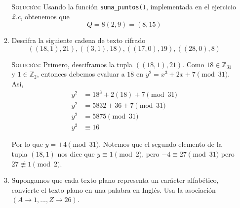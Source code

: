 \documentclass[letterpaper,11pt]{article}
\begin{document}
\begin{enumerate}
\begin{enumerate}
        \textsc{Solución:} Usando la función \texttt{suma\_puntos()}, implementada
        en el ejercicio \textit{2.c}, obtenemos que 
        \begin{equation*}
            Q = 8(2, 9) = (8, 15)
        \end{equation*}

        \item Descifra la siguiente cadena de texto cifrado 
        \begin{equation*}
            ((18, 1), 21), ((3, 1), 18), ((17, 0), 19), ((28, 0), 8)
        \end{equation*}

        \textsc{Solución:} Primero, desciframos la tupla $((18, 1), 21)$. 
        Como $18 \in \mathbb{Z}_{31}$ y $1 \in \mathbb{Z}_{2}$, entonces debemos 
        evaluar a $18$ en $y^2 = x^3 + 2x + 7 \pmod{31}$. Así,  
        \begin{align*}
            y^2 &= 18^3 + 2(18) + 7 \pmod{31} \\ 
            y^2 &= 5832 + 36 + 7 \pmod{31} \\ 
            y^2 &= 5875 \pmod{31} \\ 
            y^2 &\equiv 16
        \end{align*}

        Por lo que $y = \pm 4 \pmod{31}$. Notemos que el segundo elemento de 
        la tupla $(18, 1)$ nos dice que $y \equiv 1 \pmod{2}$, pero 
        $-4 \equiv 27 \pmod{31}$ pero $27 \not \equiv 1 \pmod{2}$.

        \item Supongamos que cada texto plano representa un carácter alfabético,
        convierte el texto plano en una palabra en Inglés. Usa la asociación 
        $(A \rightarrow 1, ..., Z \rightarrow 26)$.
    \end{enumerate}
\end{enumerate}
\end{document}
